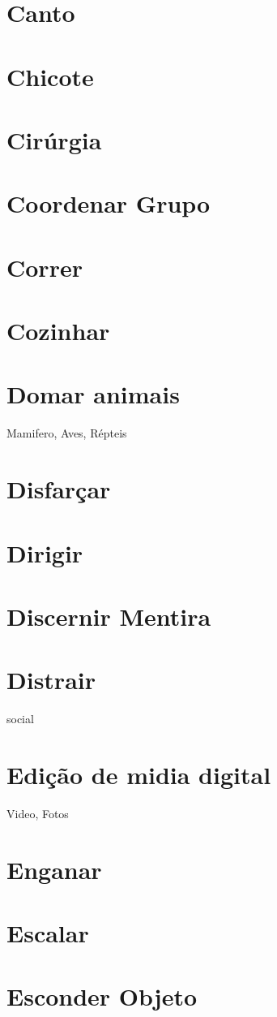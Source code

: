 \section{Canto}
\section{Chicote}
\section{Cirúrgia}
\section{Coordenar Grupo}
\section{Correr}
\section{Cozinhar}
\section{Domar animais} Mamifero, Aves, Répteis
\section{Disfarçar}
\section{Dirigir}
\section{Discernir Mentira}
\section{Distrair} social
\section{Edição de midia digital} Video, Fotos
\section{Enganar}
\section{Escalar}
\section{Esconder Objeto}
